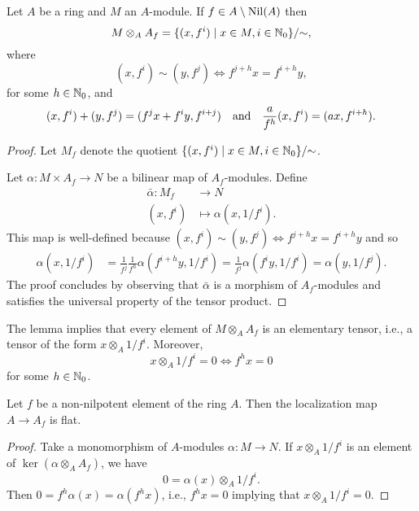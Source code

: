 \begin{lem}
    Let $A$ be a ring and $M$ an $A$-module. If $f\in A\setminus\operatorname{Nil}(A)$ then
    $$
        M\otimes_AA_f=\{(x,f^i)\mid x\in M, i\in\mathbb{N}_0\}/{\sim},
    $$
    where
    $$
        (x,f^i)\sim(y,f^j)\iff f^{j+h}x=f^{i+h}y,
    $$
    for some $h\in\mathbb{N}_0$, and
    $$
        (x,f^i)+(y,f^j)=(f^jx+f^iy,f^{i+j})
        \quad\text{\rm and}\quad \frac{a}{f^h}(x,f^i)=(ax,f^{i+h}).
    $$
\end{lem}

\begin{proof}
    Let $M_f$ denote the quotient $\{(x,f^i)\mid x\in M, i\in\mathbb{N}_0\}/{\sim}$.
    
    Let $\alpha\colon M\times A_f\to N$ be a bilinear map of $A_f$-modules. Define
    \begin{align*}
        \bar\alpha\colon M_f&\to N\\
        (x,f^i)&\mapsto\alpha(x,1/f^i).
    \end{align*}
    This map is well-defined because $(x,f^i)\sim(y,f^j)\iff f^{j+h}x=f^{i+h}y$ and so
    \begin{align*}
        \alpha(x,1/f^i) &= \frac1{f^j}\frac1{f^h}\alpha(f^{i+h}y,1/f^i)
            = \frac1{f^{j}}\alpha(f^iy,1/f^i)
            = \alpha(y,1/f^j).
    \end{align*}
    The proof concludes by observing that $\bar\alpha$ is a morphism of $A_f$-modules and satisfies the universal property of the tensor product.
\end{proof}

\begin{rem}\label{rem:f-localization-tensor}
    The lemma implies that every element of $M\otimes_AA_f$ is an elementary tensor, i.e., a tensor of the form $x\otimes_A1/f^i$. Moreover,
    $$
        x\otimes_A1/f^i=0\iff f^hx=0
    $$
    for some $h\in\mathbb{N}_0$.
\end{rem}

\begin{prop}\label{prop:flat-localization}
    Let\/ $f$ be a non-nilpotent element of the ring\/ $A$. Then the localization map\/ $A\to A_f$ is flat.
\end{prop}

\begin{proof}
    Take a monomorphism of $A$-modules $\alpha\colon M\to N$. If $x\otimes_A1/f^i$ is an element of $\ker(\alpha\otimes_AA_f)$, we have
    $$
        0 = \alpha(x)\otimes_A1/f^i.
    $$
    Then $0=f^h\alpha(x)=\alpha(f^hx)$, i.e., $f^hx=0$ implying that $x\otimes_A1/f^i=0$.
\end{proof}

